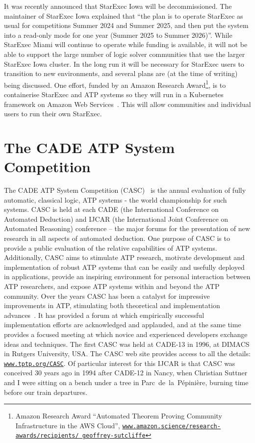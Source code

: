\documentclass[runningheads]{llncs}
\begin{document}
It was recently announced that StarExec Iowa will be decommissioned. 
The maintainer of StarExec Iowa explained that ``the plan is to operate StarExec as usual for 
competitions Summer 2024 and Summer 2025, and then put the system into a read-only mode for one 
year (Summer 2025 to Summer 2026)''.
While StarExec Miami will continue to operate while funding is available, it will not be able
to support the large number of logic solver communities that use the larger StarExec Iowa cluster.
In the long run it will be necessary for StarExec users to transition to new environments,
and several plans are (at the time of writing) being discussed.
One effort, funded by an Amazon Research Award\footnote{%
Amazon Research Award ``Automated Theorem Proving Community Infrastructure in the AWS Cloud'',
\href{https://www.amazon.science/research-awards/recipients/geoffrey-sutcliffe}{\tt www.amazon.science/research-awards/recipients/ geoffrey-sutcliffe}},
is to containerise StarExec and ATP systems so they will run in a Kubernetes framework on 
Amazon Web Services~\cite{FMS24}.
This will allow communities and individual users to run their own StarExec.

\section{The CADE ATP System Competition}
\label{CASC}

The CADE ATP System Competition (CASC)~\cite{Sut16} is the annual evaluation of fully automatic,
classical logic, ATP systems - the world championship for such systems.
CASC is held at each CADE (the International Conference on Automated Deduction) and IJCAR
(the International Joint Conference on Automated Reasoning) conference -- the major forums
for the presentation of new research in all aspects of automated deduction.
One purpose of CASC is to provide a public evaluation of the relative capabilities of ATP systems.
Additionally, CASC aims to
stimulate ATP research,
motivate development and implementation of robust ATP systems that can be easily and usefully
deployed in applications,
provide an inspiring environment for personal interaction between ATP researchers,
and
expose ATP systems within and beyond the ATP community.
Over the years CASC has been a catalyst for impressive improvements in ATP, stimulating both 
theoretical and implementation advances~\cite{Nie02-Paper}.
It has provided a forum at which empirically successful implementation efforts are acknowledged 
and applauded, and at the same time provides a focused meeting at which novice and experienced 
developers exchange ideas and techniques. 
The first CASC was held at CADE-13 in 1996, at DIMACS in Rutgers University, USA.
The CASC web site provides access to all the details:
\href{http://www.tptp.org/CASC/}{{\tt www.tptp.org/CASC}}.
Of particular interest for this IJCAR is that CASC was conceived 30 years ago in 1994 after 
CADE-12 in Nancy, when Christian Suttner and I were sitting on a bench under a tree in 
Parc~de~la~Pépinière, burning time before our train departures.
\end{document}
